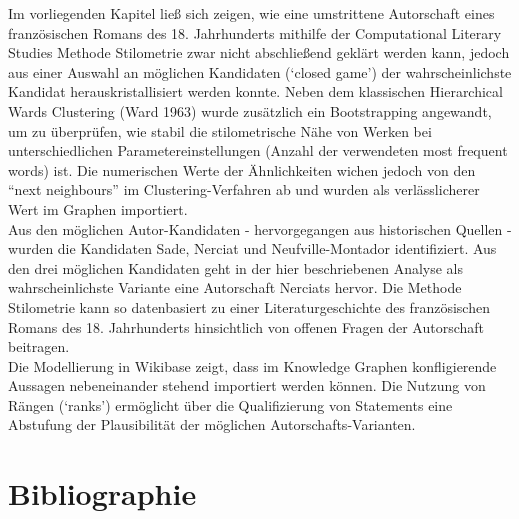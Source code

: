 \documentclass[
  12pt,
  letterpaper,
  DIV=11,
  numbers=noendperiod]{scrreprt}
\begin{document}
Im vorliegenden Kapitel ließ sich zeigen, wie eine umstrittene
Autorschaft eines französischen Romans des 18. Jahrhunderts mithilfe der
Computational Literary Studies Methode Stilometrie zwar nicht
abschließend geklärt werden kann, jedoch aus einer Auswahl an möglichen
Kandidaten (`closed game') der wahrscheinlichste Kandidat
herauskristallisiert werden konnte. Neben dem klassischen Hierarchical
Wards Clustering (Ward 1963) wurde zusätzlich ein Bootstrapping
angewandt, um zu überprüfen, wie stabil die stilometrische Nähe von
Werken bei unterschiedlichen Parametereinstellungen (Anzahl der
verwendeten most frequent words) ist. Die numerischen Werte der
Ähnlichkeiten wichen jedoch von den ``next neighbours'' im
Clustering-Verfahren ab und wurden als verlässlicherer Wert im Graphen
importiert.\\
Aus den möglichen Autor-Kandidaten - hervorgegangen aus historischen
Quellen - wurden die Kandidaten Sade, Nerciat und Neufville-Montador
identifiziert. Aus den drei möglichen Kandidaten geht in der hier
beschriebenen Analyse als wahrscheinlichste Variante eine Autorschaft
Nerciats hervor. Die Methode Stilometrie kann so datenbasiert zu einer
Literaturgeschichte des französischen Romans des 18. Jahrhunderts
hinsichtlich von offenen Fragen der Autorschaft beitragen.\\
Die Modellierung in Wikibase zeigt, dass im Knowledge Graphen
konfligierende Aussagen nebeneinander stehend importiert werden können.
Die Nutzung von Rängen (`ranks') ermöglicht über die Qualifizierung von
Statements eine Abstufung der Plausibilität der möglichen
Autorschafts-Varianten.

\section{Bibliographie}\label{bibliographie}
\end{document}
